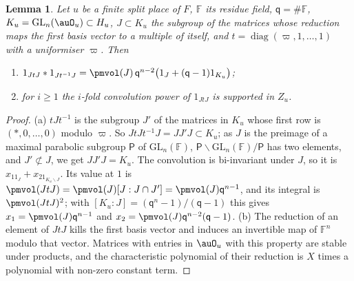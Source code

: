 \documentclass[10pt]{amsart}
\newtheorem{lemma}[theorem]{Lemma}
\theoremstyle{definition}
\theoremstyle{remark}
\providecommand{\auGL}{\mathrm{GL}}
\begin{document}
\begin{lemma}\label{pm:hecke}
Let $u$ be a finite split place of $F$, $\mathbb F$ its residue field, $\mathsf q=\#\mathbb F$,
$K_u=\auGL_n(\auO_u)\subset H_u$, $J\subset K_u$ the subgroup of the matrices whose reduction maps
the first basis vector to a multiple of itself, and $t=\operatorname{diag}(\varpi,1,\dots,1)$ with a
uniformiser $\varpi$. Then
\begin{enumerate}
\item[(a)] $1_{JtJ}*1_{Jt^{-1}J}=\pmvol(J)\,\mathsf q^{n-2}\bigl(1_J+(\mathsf q-1)1_{K_u}\bigr)$;
\item[(b)] for $i\ge1$ the $i$-fold convolution power of $1_{JtJ}$ is supported in $Z_u$.
\end{enumerate}
\end{lemma}
\begin{proof}
(a) $tJt^{-1}$ is the subgroup $J'$ of the matrices in $K_u$ whose first row is
$(\ast,0,\dots,0)$ modulo $\varpi$. So $JtJt^{-1}J=JJ'J\subset K_u$; as $J$ is the preimage of a
maximal parabolic subgroup $\mathsf P$ of $\auGL_n(\mathbb F)$, $\mathsf P\backslash\auGL_n(
\mathbb F)/\mathsf P$ has two elements, and $J'\not\subset J$, we get $JJ'J=K_u$. The convolution
is bi-invariant under $J$, so it is $x_11_J+x_21_{K_u\smallsetminus J}$. Its value at $1$ is
$\pmvol(JtJ)=\pmvol(J)[J:J\cap J']=\pmvol(J)\mathsf q^{n-1}$, and its integral is
$\pmvol(JtJ)^2$; with $[K_u:J]=(\mathsf q^n-1)/(\mathsf q-1)$ this gives $x_1=\pmvol(J)\mathsf
q^{n-1}$ and $x_2=\pmvol(J)\mathsf q^{n-2}(\mathsf q-1)$. (b) The reduction of an element of $JtJ$
kills the first basis vector and induces an invertible map of $\mathbb F^n$ modulo that vector.
Matrices with entries in $\auO_u$ with this property are stable under products, and the
characteristic polynomial of their reduction is $X$ times a polynomial with
non-zero constant term.
\end{proof}
\end{document}
